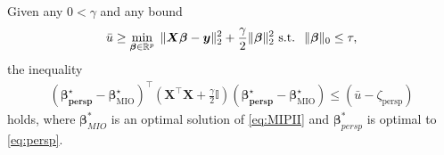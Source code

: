 \documentclass[mnsc,nonblindrev]{informs3} %
\begin{document}
\begin{theorem}\label{prop:kfoldspread}
	Given any $0 < \gamma$ and any bound
	\begin{equation}\label{eq:MIPII}
		\bar u\geq \min_{\bm{\beta}\in \mathbb{R}^p}\; \|\bm{X}\bm{\beta}-\bm{y}\|_2^2+\frac{\gamma}{2}\|\bm{\beta}\|_2^2
		\text{\rm\ s.t. }\; \|\bm{\beta}\|_0\leq \tau,
	\end{equation} 
	the inequality
	\begin{align}\label{ineq:perspbound}
		(\bm{\beta^\star_{\text{persp}}}- \bm{\beta}^\star_{\text{MIO}})^\top \left(\bm{X}^\top \bm{X}+\frac{\gamma}{2} \bm{\mathbb{I}}\right) (\bm{\beta^\star_{\text{persp}}}- \bm{\beta}^\star_{\text{MIO}}) \leq (\bar{u}-\zeta_{\text{persp}})
	\end{align}
	holds, where $\bm{\beta}_{MIO}^*$ is an optimal solution of \eqref{eq:MIPII} and $\bm{\beta}_{persp}^*$ is optimal to \eqref{eq:persp}.
\end{theorem}
\end{document}
